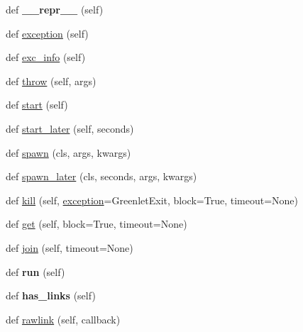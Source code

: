 \begin{DoxyCompactItemize}
\item 
\mbox{\label{classgevent_1_1greenlet_1_1_greenlet_a1177ff8b1c0ebe4c9cd6cd40c99db235}} 
def {\bfseries \+\_\+\+\_\+repr\+\_\+\+\_\+} (self)
\item 
def \hyperlink{classgevent_1_1greenlet_1_1_greenlet_a0f4b578b1eeb79d65f90a9bae439ea82}{exception} (self)
\item 
def \hyperlink{classgevent_1_1greenlet_1_1_greenlet_a682549e4c5f1de1c4d59ca5317794e39}{exc\+\_\+info} (self)
\item 
def \hyperlink{classgevent_1_1greenlet_1_1_greenlet_ac8e11fe68ed5029c47d2960552f7e155}{throw} (self, args)
\item 
def \hyperlink{classgevent_1_1greenlet_1_1_greenlet_abb02125e97e92a471b607c93a77a4913}{start} (self)
\item 
def \hyperlink{classgevent_1_1greenlet_1_1_greenlet_a9b2d04850d4da344f6205f5e63b90a0c}{start\+\_\+later} (self, seconds)
\item 
def \hyperlink{classgevent_1_1greenlet_1_1_greenlet_a2b1a7ce296b19f4a0446c2204846d065}{spawn} (cls, args, kwargs)
\item 
def \hyperlink{classgevent_1_1greenlet_1_1_greenlet_ab3028dc939235971377102aef48ae820}{spawn\+\_\+later} (cls, seconds, args, kwargs)
\item 
def \hyperlink{classgevent_1_1greenlet_1_1_greenlet_a3daff110b6787a38d7bd8fe948d86246}{kill} (self, \hyperlink{classgevent_1_1greenlet_1_1_greenlet_a0f4b578b1eeb79d65f90a9bae439ea82}{exception}=Greenlet\+Exit, block=True, timeout=None)
\item 
def \hyperlink{classgevent_1_1greenlet_1_1_greenlet_a7bb59bb6362b31d8196b490408d6badf}{get} (self, block=True, timeout=None)
\item 
def \hyperlink{classgevent_1_1greenlet_1_1_greenlet_a90e26227545397efc018cd7754d48547}{join} (self, timeout=None)
\item 
\mbox{\label{classgevent_1_1greenlet_1_1_greenlet_a245e7c309501968b81fc07354f5fedc3}} 
def {\bfseries run} (self)
\item 
\mbox{\label{classgevent_1_1greenlet_1_1_greenlet_a8105adca3e719a8eb15d79a0f20a1137}} 
def {\bfseries has\+\_\+links} (self)
\item 
def \hyperlink{classgevent_1_1greenlet_1_1_greenlet_a4e645565cee3f1c7cec6585ad414d66e}{rawlink} (self, callback)

\end{DoxyCompactItemize}

